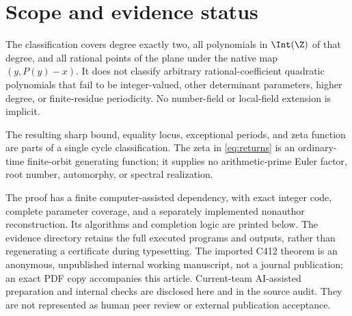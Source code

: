 \section{Scope and evidence status}
\label{sec:scope}

The classification covers degree exactly two, all polynomials in
$\Int(\Z)$ of that degree, and all rational points of the plane
under the native map $(y,P(y)-x)$.
It does not classify arbitrary rational-coefficient quadratic
polynomials that fail to be integer-valued, other determinant
parameters, higher degree, or finite-residue periodicity.
No number-field or local-field extension is implicit.

The resulting sharp bound, equality locus, exceptional periods,
and zeta function are parts of a single cycle classification.
The zeta in \eqref{eq:returns} is an ordinary-time finite-orbit
generating function; it supplies no arithmetic-prime Euler
factor, root number, automorphy, or spectral realization.

The proof has a finite computer-assisted dependency, with exact
integer code, complete parameter coverage, and a separately
implemented nonauthor reconstruction. Its algorithms and
completion logic are printed below. The evidence directory
retains the full executed programs and outputs, rather than
regenerating a certificate during typesetting.
The imported C412 theorem is an anonymous, unpublished internal
working manuscript, not a journal publication; an exact PDF
copy accompanies this article. Current-team AI-assisted
preparation and internal checks are disclosed here and in the
source audit. They are not represented as human peer review or
external publication acceptance.
